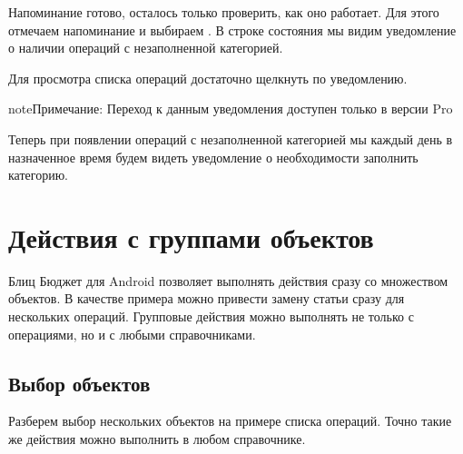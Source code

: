 \documentclass[a4paper,10pt,russian]{sphinxmanual}
\begin{document}
\noindent{}

\noindent{}

\noindent{}

Напоминание готово, осталось только проверить, как оно работает. Для этого отмечаем напоминание и выбираем
. В строке состояния мы видим уведомление о наличии операций с незаполненной категорией.

\noindent{}

\noindent{}

\noindent{}

Для просмотра списка операций достаточно щелкнуть по уведомлению.

\begin{sphinxadmonition}{note}{Примечание:}
Переход к данным уведомления доступен только в версии Pro
\end{sphinxadmonition}

Теперь при появлении операций с незаполненной категорией мы каждый день в назначенное время
будем видеть уведомление о необходимости заполнить категорию.


\chapter{Действия с группами объектов}
\label{\detokenize{bulk-actions:chapter-bulk-actions}}\label{\detokenize{bulk-actions:id1}}\label{\detokenize{bulk-actions::doc}}
Блиц Бюджет для Android позволяет выполнять действия сразу со множеством объектов. В качестве примера можно привести замену
статьи сразу для нескольких операций. Групповые действия можно выполнять не только с операциями, но и с
любыми справочниками.


\section{Выбор объектов}
\label{\detokenize{bulk-actions:id2}}
Разберем выбор нескольких объектов на примере списка операций. Точно такие же действия можно выполнить в
любом справочнике.

\noindent{}
\end{document}
